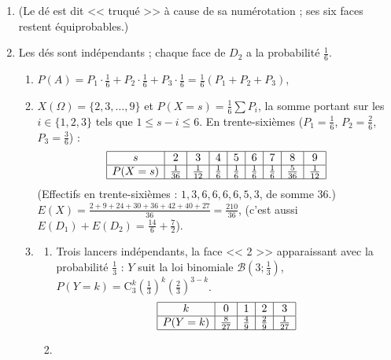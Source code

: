 \begin{enumerate}
   \item {}
      (Le d\'e est dit << truqu\'e >> \`a cause de sa num\'erotation ; ses six faces restent \'equiprobables.)
      \par\noindent{}
   \item Les d\'es sont ind\'ependants ; chaque face de $D_2$ a la probabilit\'e $\frac{1}{6}$.
      \begin{enumerate}
         \item {}
            $P(A) = P_1\cdot\frac{1}{6} + P_2\cdot\frac{1}{6} + P_3\cdot\frac{1}{6} = \frac{1}{6}(P_1 + P_2 + P_3)$,
            \par\noindent{}
         \item {}
            $X(\Omega) = \{2, 3, \dots, 9\}$ et $P(X = s) = \frac{1}{6}\sum P_i$, la somme portant sur les $i \in \{1, 2, 3\}$ tels que
            $1 \leq s - i \leq 6$. En trente-sixi\`emes ($P_1 = \frac{1}{6}$, $P_2 = \frac{2}{6}$, $P_3 = \frac{3}{6}$) :
            \[
               \begin{array}{|c|c|c|c|c|c|c|c|c|}
                  \hline
                  s & 2 & 3 & 4 & 5 & 6 & 7 & 8 & 9 \\ \hline
                  P(X = s) & \frac{1}{36} & \frac{1}{12} & \frac{1}{6} & \frac{1}{6} & \frac{1}{6} & \frac{1}{6} & \frac{5}{36} & \frac{1}{12} \\ \hline
               \end{array}
            \]
            (Effectifs en trente-sixi\`emes : $1, 3, 6, 6, 6, 6, 5, 3$, de somme $36$.)
            $E(X) = \frac{2 + 9 + 24 + 30 + 36 + 42 + 40 + 27}{36} = \frac{210}{36}$, 
            (c'est aussi $E(D_1) + E(D_2) = \frac{14}{6} + \frac{7}{2}$).
         \item
            \begin{enumerate}
               \item {}
                  Trois lancers ind\'ependants, la face << 2 >> apparaissant avec la probabilit\'e $\frac{1}{3}$ :
                  $Y$ suit la loi binomiale $\mathscr{B}\left(3 ; \frac{1}{3}\right)$, $P(Y = k) = \mathrm{C}_3^k\left(\frac{1}{3}\right)^k\left(\frac{2}{3}\right)^{3-k}$.
                  \[
                     \begin{array}{|c|c|c|c|c|}
                        \hline
                        k & 0 & 1 & 2 & 3 \\ \hline
                        P(Y = k) & \frac{8}{27} & \frac{4}{9} & \frac{2}{9} & \frac{1}{27} \\ \hline
                     \end{array}
                  \]
               \item {} 
            \end{enumerate}
      \end{enumerate}
\end{enumerate}
